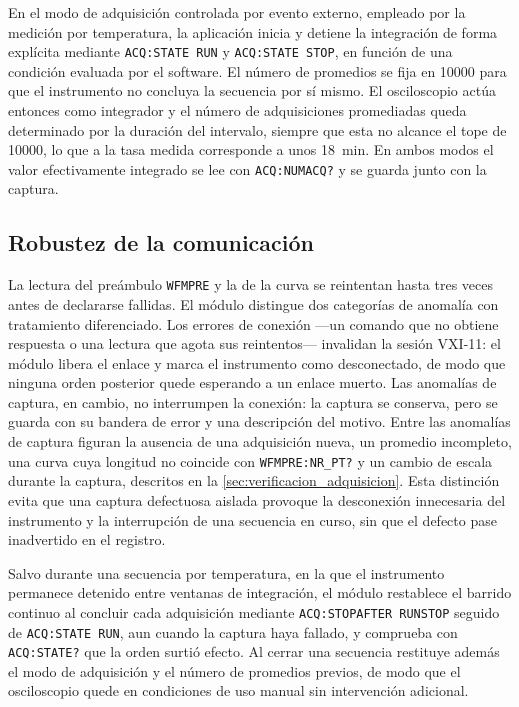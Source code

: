 En el modo de adquisición controlada por evento externo, empleado por
la medición por temperatura, la aplicación inicia y detiene la
integración de forma explícita mediante \texttt{ACQ:STATE RUN} y
\texttt{ACQ:STATE STOP}, en función de una condición evaluada por el
software. El número de promedios se fija en \num{10000} para que el
instrumento no concluya la secuencia por sí mismo. El osciloscopio
actúa entonces como integrador y el número de adquisiciones
promediadas queda determinado por la duración del intervalo, siempre
que esta no alcance el tope de \num{10000}, lo que a la tasa medida
corresponde a unos \SI{18}{\minute}. En ambos modos el valor
efectivamente integrado se lee con \texttt{ACQ:NUMACQ?} y se guarda
junto con la captura.

\subsection*{Robustez de la comunicación}

La lectura del preámbulo \texttt{WFMPRE} y la de la curva se
reintentan hasta tres veces antes de declararse fallidas. El módulo
distingue dos categorías de anomalía con tratamiento diferenciado. Los
errores de conexión ---un comando que no obtiene respuesta o una
lectura que agota sus reintentos--- invalidan la sesión VXI-11: el
módulo libera el enlace y marca el instrumento como desconectado, de
modo que ninguna orden posterior quede esperando a un enlace muerto.
Las anomalías de captura, en cambio, no interrumpen la conexión: la
captura se conserva, pero se guarda con su bandera de error y una
descripción del motivo. Entre las anomalías de captura figuran la
ausencia de una adquisición nueva, un promedio incompleto, una curva cuya longitud no
coincide con \texttt{WFMPRE:NR\_PT?} y un cambio de escala durante la
captura, descritos en la \cref{sec:verificacion_adquisicion}. Esta distinción evita que una
captura defectuosa aislada provoque la desconexión innecesaria del
instrumento y la interrupción de una secuencia en curso, sin que el
defecto pase inadvertido en el registro.

Salvo durante una secuencia por temperatura, en la que el instrumento
permanece detenido entre ventanas de integración, el módulo restablece
el barrido continuo al concluir cada adquisición mediante
\texttt{ACQ:STOPAFTER RUNSTOP} seguido de \texttt{ACQ:STATE RUN}, aun
cuando la captura haya fallado, y comprueba con \texttt{ACQ:STATE?}
que la orden surtió efecto. Al cerrar una secuencia restituye además
el modo de adquisición y el número de promedios previos, de modo que
el osciloscopio quede en condiciones de uso manual sin intervención
adicional.

